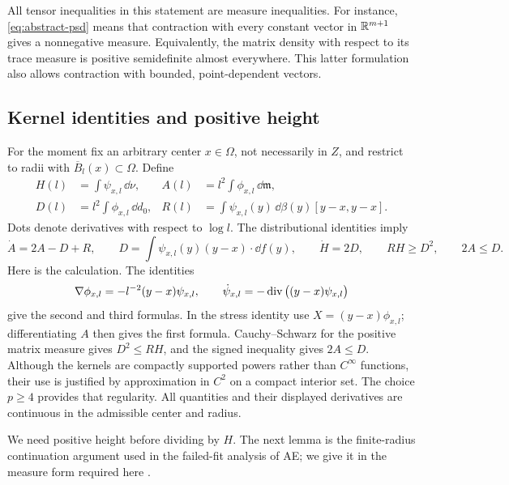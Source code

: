 All tensor inequalities in this statement are measure inequalities.
For instance, \eqref{eq:abstract-psd} means that contraction with
every constant vector in $\mathbb R^{m+1}$ gives a nonnegative measure.
Equivalently, the matrix density with respect to its trace measure is
positive semidefinite almost everywhere. This latter formulation also
allows contraction with bounded, point-dependent vectors.

\subsection{Kernel identities and positive height}

For the moment fix an arbitrary center $x\in\Omega$, not necessarily
in $Z$, and restrict to radii with
$\overline B_l(x)\subset\Omega$. Define
\begin{equation}
 \label{eq:abstract-frequencies}
 \begin{aligned}
 H(l)&=\int\psi_{x,l}\,\dd\nu,&
 A(l)&=l^2\int\phi_{x,l}\,\dd\mathfrak m,\\
 D(l)&=l^2\int\phi_{x,l}\,\dd d_0,&
 R(l)&=\int\psi_{x,l}(y)\,\dd\beta(y)[y-x,y-x].
 \end{aligned}
\end{equation}
Dots denote derivatives with respect to $\log l$. The distributional
identities imply
\begin{equation}
 \label{eq:exact-frequency-identities}
 \dot A=2A-D+R,\qquad
 D=\int\psi_{x,l}(y)(y-x)\cdot\dd f(y),\qquad
 \dot H=2D,\qquad RH\ge D^2,\qquad 2A\le D.
\end{equation}
Here is the calculation. The identities
\[
 \nabla\phi_{x,l}=-l^{-2}(y-x)\psi_{x,l},\qquad
 \dot\psi_{x,l}=-\operatorname{div}\big((y-x)\psi_{x,l}\big)
\]
give the second and third formulas. In the stress identity use
$X=(y-x)\phi_{x,l}$; differentiating $A$ then gives the first
formula. Cauchy--Schwarz for the positive matrix measure gives
$D^2\le RH$, and the signed inequality gives $2A\le D$.
Although the kernels are compactly supported powers rather than
$C^\infty$ functions, their use is justified by approximation in
$C^2$ on a compact interior set. The choice $p\ge4$ provides that
regularity. All quantities and their displayed derivatives are
continuous in the admissible center and radius.

We need positive height before dividing by $H$. The next lemma is
the finite-radius continuation argument used in the failed-fit
analysis of AE; we give it in the measure form required here
\cite[Proof of Lemma~7.2]{AE}.

